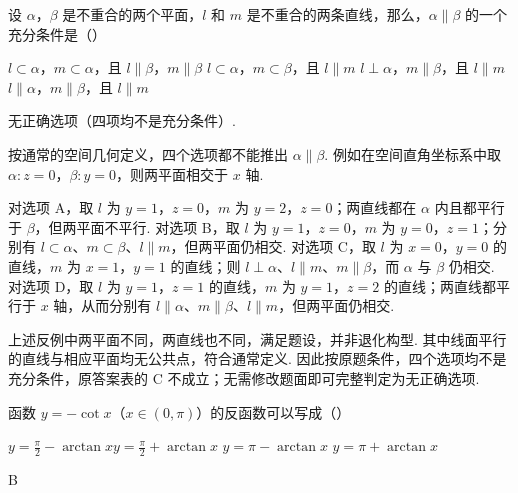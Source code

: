 \begin{problem}

设 \(\alpha\)，\(\beta\) 是不重合的两个平面，\(l\) 和 \(m\) 是不重合的两条直线，那么，\(\alpha \parallel \beta\) 的一个充分条件是（\quad）

\choices
{\(l \subset \alpha \)，\(m \subset \alpha \)，且 \(l \parallel \beta \)，\(m \parallel \beta \)}
{\(l \subset \alpha \)，\(m \subset \beta \)，且 \(l \parallel m \)}
{\(l \perp \alpha \)，\(m \parallel \beta \)，且 \(l \parallel m \)}
{\(l \parallel \alpha \)，\(m \parallel \beta \)，且 \(l \parallel m \)}
\end{problem}

\begin{answer}
无正确选项（四项均不是充分条件）.
\end{answer}

\begin{solution}
按通常的空间几何定义，四个选项都不能推出 \(\alpha\parallel\beta\). 例如在空间直角坐标系中取 \(\alpha:z=0\)，\(\beta:y=0\)，则两平面相交于 \(x\) 轴.

对选项 A，取 \(l\) 为 \(y=1\)，\(z=0\)，\(m\) 为 \(y=2\)，\(z=0\)；两直线都在 \(\alpha\) 内且都平行于 \(\beta\)，但两平面不平行. 对选项 B，取 \(l\) 为 \(y=1\)，\(z=0\)，\(m\) 为 \(y=0\)，\(z=1\)；分别有 \(l\subset\alpha\)、\(m\subset\beta\)、\(l\parallel m\)，但两平面仍相交. 对选项 C，取 \(l\) 为 \(x=0\)，\(y=0\) 的直线，\(m\) 为 \(x=1\)，\(y=1\) 的直线；则 \(l\perp\alpha\)、\(l\parallel m\)、\(m\parallel\beta\)，而 \(\alpha\) 与 \(\beta\) 仍相交. 对选项 D，取 \(l\) 为 \(y=1\)，\(z=1\) 的直线，\(m\) 为 \(y=1\)，\(z=2\) 的直线；两直线都平行于 \(x\) 轴，从而分别有 \(l\parallel\alpha\)、\(m\parallel\beta\)、\(l\parallel m\)，但两平面仍相交.

上述反例中两平面不同，两直线也不同，满足题设，并非退化构型. 其中线面平行的直线与相应平面均无公共点，符合通常定义. 因此按原题条件，四个选项均不是充分条件，原答案表的 C 不成立；无需修改题面即可完整判定为无正确选项.
\end{solution}

\begin{problem}

函数 \(y=-\cot x\)（\(x\in(0,\pi)\)）的反函数可以写成（\quad）

\choices
{\(y=\frac{\pi}{2}-\arctan x \)}{\(y=\frac{\pi}
{2}+\arctan x \)}
{\(y=\pi-\arctan x \)}
{\(y=\pi+\arctan x \)}
\end{problem}

\begin{answer}
B
\end{answer}

